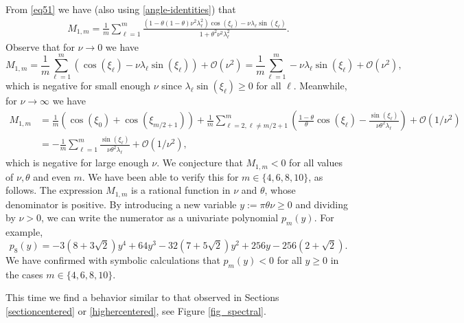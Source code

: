 \documentclass[a4paper]{article}
\begin{document}
\begin{description}[style=unboxed,leftmargin=0cm]
\item [{Case 1:} $m$ is {even}.]
From \eqref{eq51} we have (also using \eqref{angle-identities}) that
\begin{align*}
  M_{1,m} = \frac{1}{m} \sum_{\ell=1}^{m} \frac{\left(1-\theta(1-\theta)\nu^2\lambda_\ell^2\right)
  \cos(\xi_\ell) - \nu\lambda_\ell\sin(\xi_\ell)}{1+\theta^2\nu^2\lambda_\ell^2}.
\end{align*}
Observe that for $\nu \to 0$ we have
$$
    M_{1,m} = \frac{1}{m}\sum_{\ell=1}^m\left( \cos(\xi_\ell)-\nu \lambda_\ell \sin(\xi_\ell)\right) + {\mathcal O}(\nu^2) = \frac{1}{m}\sum_{\ell=1}^m -\nu \lambda_\ell \sin(\xi_\ell)+ {\mathcal O}(\nu^2),
$$
which is negative for small enough $\nu$ since $\lambda_\ell \sin(\xi_\ell)\ge 0$ for all $\ell$.
Meanwhile, for $\nu \to \infty$ we have
\begin{align*}
    M_{1,m} & = \frac{1}{m}(\cos(\xi_0)+\cos(\xi_{m/2+1})) + \frac{1}{m} \sum_{\ell=2, \ell\ne m/2+1}^m \left(\frac{1-\theta}{\theta}\cos(\xi_\ell) - \frac{\sin(\xi_\ell)}{\nu\theta^2\lambda_\ell}\right) + {\mathcal O}(1/\nu^2) \\
              & =  -\frac{1}{m} \sum_{\ell=1}^m  \frac{\sin(\xi_\ell)}{\nu\theta^2\lambda_\ell}+ {\mathcal O}(1/\nu^2),
\end{align*}
which is negative for large enough $\nu$.  We conjecture that $M_{1,m}<0$ for all values of $\nu, \theta$
and even $m$.  We have been able to verify this for $m\in\{4,6,8,10\}$, as follows.
The expression $M_{1,m}$ is a rational function in $\nu$ and $\theta$, whose
denominator is positive. By introducing a new variable $y:=\pi\theta\nu\ge 0$
and dividing by $\nu>0$, we can write the numerator as a univariate polynomial 
$p_m(y)$.  For example,
$$p_8(y) = -3 \left(8+3 \sqrt{2}\right) y^4+64 y^3-32 \left(7+5 \sqrt{2}\right) y^2+256 y-256 \left(2+\sqrt{2}\right).$$
We have confirmed with symbolic calculations that $p_m(y)<0$
for all $y\ge 0$ in the cases $m\in\{4,6,8,10\}$. 

\item [{Case 2:} $m$ is {odd}.]
This time we find a behavior similar to that observed in Sections \ref{sectioncentered} or \ref{highercentered}, see Figure \ref{fig_spectral}.
\end{description}
\end{document}
